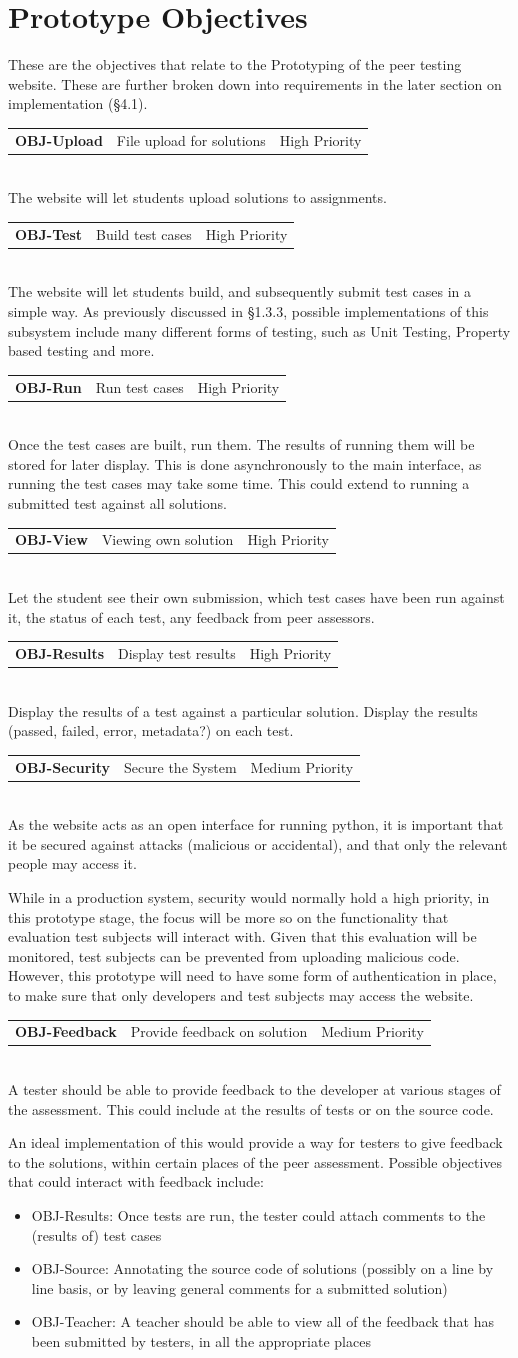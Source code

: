 \documentclass[a4paper,11pt]{report}
\newcommand{\objitem}[4]{\begin{tabularx}{\textwidth}{lXr} \textbf{OBJ-#1} & #2 & #3\end{tabularx}\\#4\\}
\begin{document}
\section{Prototype Objectives}
These are the objectives that relate to the Prototyping of the peer testing website. These are further broken down into requirements in the later section on implementation (\S4.1).
\objitem{Upload}{File upload for solutions}{High Priority}{The website will let students upload solutions to assignments.}
\objitem{Test}{Build test cases}{High Priority}{The website will let students build, and subsequently submit test cases in a simple way. As previously discussed in \S1.3.3, possible implementations of this subsystem include many different forms of testing, such as Unit Testing, Property based testing and more.}
\objitem{Run}{Run test cases}{High Priority}{Once the test cases are built, run them. The results of running them will be stored for later display. This is done asynchronously to the main interface, as running the test cases may take some time. This could extend to running a submitted test against all solutions.}
\objitem{View}{Viewing own solution}{High Priority}{Let the student see their own submission, which test cases have been run against it, the status of each test, any feedback from peer assessors.}
\objitem{Results}{Display test results}{High Priority}{Display the results of a test against a particular solution. Display the results (passed, failed, error, metadata?) on each test.}
\objitem{Security}{Secure the System}{Medium Priority}{As the website acts as an open interface for running python, it is important that it be secured against attacks (malicious or accidental), and that only the relevant people may access it.\par
While in a production system, security would normally hold a high priority, in this prototype stage, the focus will be more so on the functionality that evaluation test subjects will interact with. Given that this evaluation will be monitored, test subjects can be prevented from uploading malicious code. However, this prototype will need to have some form of authentication in place, to make sure that only developers and test subjects may access the website.}
\objitem{Feedback}{Provide feedback on solution}{Medium Priority}{A tester should be able to provide feedback to the developer at various stages of the assessment. This could include at the results of tests or on the source code.\par
An ideal implementation of this would provide a way for testers to give feedback to the solutions, within certain places of the peer assessment. Possible objectives that could interact with feedback include:
\begin{itemize}
 \item OBJ-Results: Once tests are run, the tester could attach comments to the (results of) test cases
 \item OBJ-Source: Annotating the source code of solutions (possibly on a line by line basis, or by leaving general comments for a submitted solution)
 \item OBJ-Teacher: A teacher should be able to view all of the feedback that has been submitted by testers, in all the appropriate places
\end{itemize}~}
\end{document}
